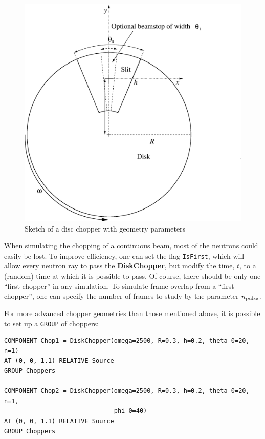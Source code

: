 \begin{figure}[ht]
\centering
\includegraphics[width=0.8\linewidth]{figures/DiskChopper.eps}
\caption{Sketch of a disc chopper with geometry parameters}
\label{f:chopper1}
\end{figure}


%

When simulating the chopping of a continuous beam,
most of the neutrons could easily be lost.
To improve efficiency, one can set the flag \verb+IsFirst+, which will
allow every neutron ray to pass the {\bf DiskChopper}, but modify the
time, $t$, to a (random) time at which it is possible to pass.
Of course, there should be only one ``first chopper'' in
any simulation.
To simulate frame overlap from a ``first chopper'', one can specify
the number of frames to study by the parameter $n_{\rm pulse}$.

For more advanced chopper geometries than those mentioned above, it is
possible to set up a \texttt{GROUP} of choppers:

\begin{lstlisting}
COMPONENT Chop1 = DiskChopper(omega=2500, R=0.3, h=0.2, theta_0=20, n=1)
AT (0, 0, 1.1) RELATIVE Source
GROUP Choppers

COMPONENT Chop2 = DiskChopper(omega=2500, R=0.3, h=0.2, theta_0=20, n=1,
                              phi_0=40)
AT (0, 0, 1.1) RELATIVE Source
GROUP Choppers
\end{lstlisting}


